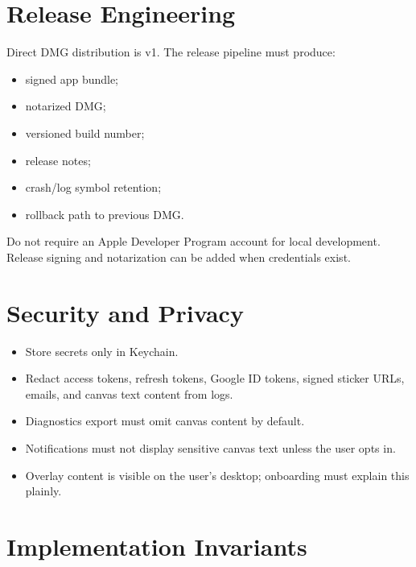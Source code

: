 \documentclass[11pt]{article}
\begin{document}
\section{Release Engineering}

Direct DMG distribution is v1. The release pipeline must produce:
\begin{itemize}
  \item signed app bundle;
  \item notarized DMG;
  \item versioned build number;
  \item release notes;
  \item crash/log symbol retention;
  \item rollback path to previous DMG.
\end{itemize}

Do not require an Apple Developer Program account for local development. Release signing and notarization can be added when credentials exist.

\section{Security and Privacy}

\begin{itemize}
  \item Store secrets only in Keychain.
  \item Redact access tokens, refresh tokens, Google ID tokens, signed sticker URLs, emails, and canvas text content from logs.
  \item Diagnostics export must omit canvas content by default.
  \item Notifications must not display sensitive canvas text unless the user opts in.
  \item Overlay content is visible on the user's desktop; onboarding must explain this plainly.
\end{itemize}

\section{Implementation Invariants}
\end{document}
